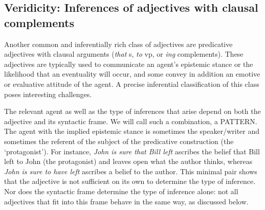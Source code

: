 \documentclass[10pt]{article}
\begin{document}
\vspace {-3mm}

\subsection{Veridicity: Inferences of adjectives with clausal complements}
\vspace {-2mm}



Another common and inferentially rich class of adjectives are predicative adjectives with clausal arguments (\emph{that} {\sc s}, \emph{to} {\sc vp}, or \emph{ing} complements). These adjectives are typically used to communicate an agent's epistemic stance or the likelihood that an eventuality will occur, and some convey in addition an emotive or evaluative attitude of the agent. 
A precise inferential classification of this class poses interesting challenges.

The relevant agent as well as the type of inferences that arise depend
on both the adjective and its syntactic frame.  We will call such a combination, a PATTERN. The agent with the implied epistemic stance is sometimes the speaker/writer and sometimes
the referent of the subject of the predicative construction (the
`protagonist').  For instance, \textit{John is sure that Bill left}
ascribes the belief that Bill left to John (the protagonist) and
leaves open what the author thinks, whereas \textit{John is sure to have
left} ascribes a belief to the author. This minimal pair shows that the adjective is not sufficient on its own to determine the type of inference. 
Nor does the syntactic frame determine the type of inference alone: not all adjectives that fit into this frame behave in the same way, as discussed below.
\end{document}

